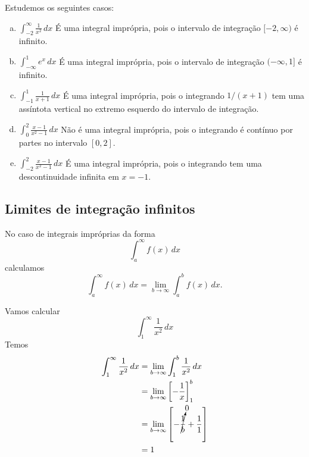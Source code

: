 \begin{ex}
  Estudemos os seguintes casos:
  \begin{enumerate}[a)]
  \item $\displaystyle\int_{-2}^\infty \frac{1}{x^2}\,dx$
    É uma integral imprópria, pois o intervalo de integração $[-2, \infty)$ é infinito.
  \item $\displaystyle\int_{-\infty}^{1}e^{x}\,dx$
    É uma integral imprópria, pois o intervalo de integração $(-\infty, 1]$ é infinito.
  \item $\displaystyle\int_{-1}^{1}\frac{1}{x+1}\,dx$
    É uma integral imprópria, pois o integrando $1/(x+1)$ tem uma assíntota vertical no extremo esquerdo do intervalo de integração.
  \item $\displaystyle\int_{0}^2\frac{x-1}{x^2-1}\,dx$
    Não é uma integral imprópria, pois o integrando é contínuo por partes no intervalo $[0,2]$.
  \item $\displaystyle\int_{-2}^2\frac{x-1}{x^2-1}\,dx$
    É uma integral imprópria, pois o integrando tem uma descontinuidade infinita em $x=-1$.
  \end{enumerate}
\end{ex}

\subsection{Limites de integração infinitos}

No caso de integrais impróprias da forma
\begin{equation}
  \int_a^\infty f(x)\,dx
\end{equation}
calculamos
\begin{equation}
  \int_a^\infty f(x)\,dx = \lim_{b\to\infty}\int_a^bf(x)\,dx.
\end{equation}

\begin{ex}
  Vamos calcular
  \begin{equation}
    \int_1^\infty\frac{1}{x^2}\,dx
  \end{equation}
  Temos
  \begin{align}
    \int_1^\infty\frac{1}{x^2}\,dx &= \lim_{b\to\infty}\int_1^b\frac{1}{x^2}\,dx\\
                                   &= \lim_{b\to\infty} \left[-\frac{1}{x}\right]_1^b\\
                                   &= \lim_{b\to\infty} \left[-\cancelto{0}{\frac{1}{b}} + \frac{1}{1}\right]\\
                                   &= 1
  \end{align}
\end{ex}

